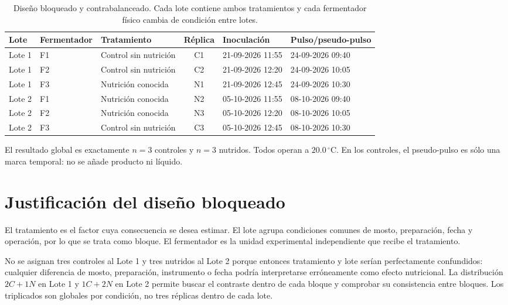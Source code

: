 \documentclass[11pt,a4paper]{article}
\begin{document}
\begin{table}[ht]
\centering
\small
\begin{tabularx}{\textwidth}{@{}l l Y c l l@{}}
\toprule
Lote & Fermentador & Tratamiento & Réplica & Inoculación & Pulso/pseudo-pulso\\
\midrule
Lote 1 & F1 & Control sin nutrición & C1 & 21-09-2026 11:55 & 24-09-2026 09:40\\
Lote 1 & F2 & Control sin nutrición & C2 & 21-09-2026 12:20 & 24-09-2026 10:05\\
Lote 1 & F3 & Nutrición conocida & N1 & 21-09-2026 12:45 & 24-09-2026 10:30\\
\midrule
Lote 2 & F1 & Nutrición conocida & N2 & 05-10-2026 11:55 & 08-10-2026 09:40\\
Lote 2 & F2 & Nutrición conocida & N3 & 05-10-2026 12:20 & 08-10-2026 10:05\\
Lote 2 & F3 & Control sin nutrición & C3 & 05-10-2026 12:45 & 08-10-2026 10:30\\
\bottomrule
\end{tabularx}
\caption{Diseño bloqueado y contrabalanceado. Cada lote contiene ambos
tratamientos y cada fermentador físico cambia de condición entre lotes.}
\end{table}

El resultado global es exactamente \(n=3\) controles y \(n=3\) nutridos. Todos
operan a \(20.0\,^{\circ}\mathrm{C}\). En los controles, el pseudo-pulso es sólo
una marca temporal: no se añade producto ni líquido.

\section{Justificación del diseño bloqueado}

El tratamiento es el factor cuya consecuencia se desea estimar. El lote agrupa
condiciones comunes de mosto, preparación, fecha y operación, por lo que se trata
como bloque. El fermentador es la unidad experimental independiente que recibe
el tratamiento.

No se asignan tres controles al Lote 1 y tres nutridos al Lote 2 porque entonces
tratamiento y lote serían perfectamente confundidos: cualquier diferencia de
mosto, preparación, instrumento o fecha podría interpretarse erróneamente como
efecto nutricional. La distribución \(2C+1N\) en Lote 1 y \(1C+2N\) en Lote 2
permite buscar el contraste dentro de cada bloque y comprobar su consistencia
entre bloques. Los triplicados son globales por condición, no tres réplicas
dentro de cada lote.
\end{document}
